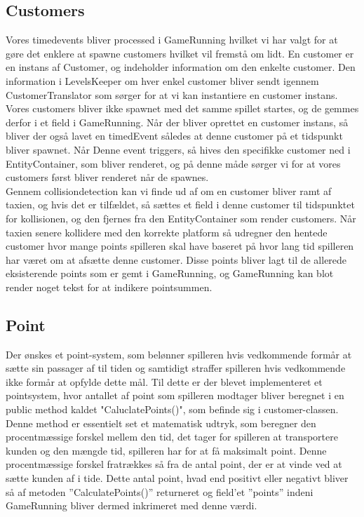    \subsection{Customers}
   Vores timedevents bliver processed i GameRunning hvilket vi har valgt for at gøre det enklere at spawne customers hvilket vil fremstå om lidt. En customer er en instans af Customer, og indeholder information om den enkelte customer. Den information i LevelsKeeper om hver enkel customer bliver sendt igennem CustomerTranslator som sørger for at vi kan instantiere en customer instans. Vores customers bliver ikke spawnet med det samme spillet startes, og de gemmes derfor i et field i GameRunning. Når der bliver oprettet en customer instans, så bliver der også lavet en timedEvent således at denne customer på et tidspunkt bliver spawnet. Når Denne event triggers, så hives den specifikke customer ned i EntityContainer, som bliver renderet, og på denne måde sørger vi for at vores customers først bliver renderet når de spawnes.\\
   Gennem collisiondetection kan vi finde ud af om en customer bliver ramt af taxien, og hvis det er tilfældet, så sættes et field i denne customer til tidspunktet for kollisionen, og den fjernes fra den EntityContainer som render customers. Når taxien senere kollidere med den korrekte platform så udregner den hentede customer hvor mange points spilleren skal have baseret på hvor lang tid spilleren har været om at afsætte denne customer. Disse points bliver lagt til de allerede eksisterende points som er gemt i GameRunning, og GameRunning kan blot render noget tekst for at indikere pointsummen.

   \subsection{Point}
   Der ønskes et point-system, som belønner spilleren hvis vedkommende formår at sætte sin passager af til tiden og samtidigt straffer spilleren hvis vedkommende ikke formår at opfylde dette mål.
   Til dette er der blevet implementeret et pointsystem, hvor antallet af point som spilleren modtager bliver beregnet i en public method kaldet "CaluclatePoints()", som befinde sig i customer-classen.
   Denne method er essentielt set et matematisk udtryk, som beregner den procentmæssige forskel mellem den tid, det tager for spilleren at transportere kunden og den mængde tid, spilleren har for at få maksimalt point. Denne procentmæssige forskel fratrækkes så fra de antal point, der er at vinde ved at sætte kunden af i tide.
   Dette antal point, hvad end positivt eller negativt bliver så af metoden ''CalculatePoints()'' returneret og field'et ''points'' indeni GameRunning bliver dermed inkrimeret med denne værdi.
   

